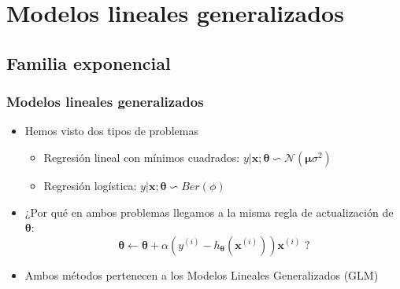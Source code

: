 \documentclass[10pt]{beamer}
\begin{document}
\section{Modelos lineales generalizados}
\subsection{Familia exponencial}
\begin{frame}
  \frametitle{Modelos lineales generalizados}
  \begin{itemize}
  \item Hemos visto dos tipos de problemas
  \begin{itemize}
  \item Regresión lineal con mínimos cuadrados: $y\vert \boldsymbol{x};\boldsymbol{\theta} \backsim \mathcal{N}(\boldsymbol{\mu} \sigma^2)$
  \item Regresión logística:  $y\vert \boldsymbol{x};\boldsymbol{\theta} \backsim Ber(\phi)$
  \end{itemize}
  \item ¿Por qué en ambos problemas llegamos a la misma regla de actualización de $\boldsymbol{\theta}$: 
       \begin{equation*}
        \boldsymbol{\theta}\leftarrow \boldsymbol{\theta} + \alpha \left( y^{(i)}- h_{\boldsymbol{\theta}} (\boldsymbol{x}^{(i)}) \right) \boldsymbol{x}^{(i)} \text{  ?}
       \end{equation*}
       \item Ambos métodos pertenecen a los Modelos Lineales Generalizados (GLM)
  \end{itemize}
\end{frame}
\end{document}
